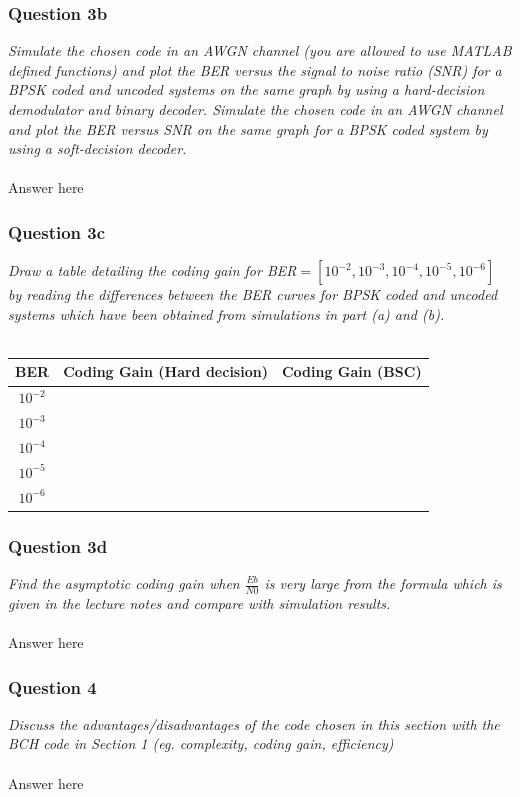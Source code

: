 \documentclass[a4paper]{article}
\begin{document}
\subsubsection{Question 3b} \textit{Simulate the chosen code in an AWGN channel (you are allowed to use MATLAB defined functions) and plot the BER versus the signal to noise ratio (SNR) for a BPSK coded and uncoded systems on the same graph by using a hard-decision demodulator and binary decoder. Simulate the chosen code in an AWGN channel and plot the BER versus SNR on the same graph for a BPSK coded system by using a soft-decision decoder.} \\
\\
Answer here \\

\subsubsection{Question 3c} \textit{Draw a table detailing the coding gain for BER$= [10^{−2}, 10^{−3}, 10^{−4} , 10^{−5} , 10^{−6} ]$ by reading the differences between the BER curves for BPSK coded and uncoded systems which have been obtained from simulations in part (a) and (b).}\\
\\
\begin{tabular}{| c | c | c |}
\hline
BER & Coding Gain (Hard decision) & Coding Gain (BSC) \\
\hline
$10^{-2}$ & & \\
\hline
$10^{-3}$ & & \\
\hline
$10^{-4}$ & & \\
\hline
$10^{-5}$ & & \\
\hline
$10^{-6}$ & & \\
\hline
\end{tabular}

\subsubsection{Question 3d} \textit{Find the asymptotic coding gain when $\frac{Eb}{N0}$ is very large from the formula which is given in the lecture notes and compare with simulation results.} \\
\\
Answer here \\

\subsubsection{Question 4} \textit{Discuss the advantages/disadvantages of the code chosen in this section with the BCH code in Section 1 (eg. complexity, coding gain, efficiency)}\\
\\
Answer here \\



\end{document}
